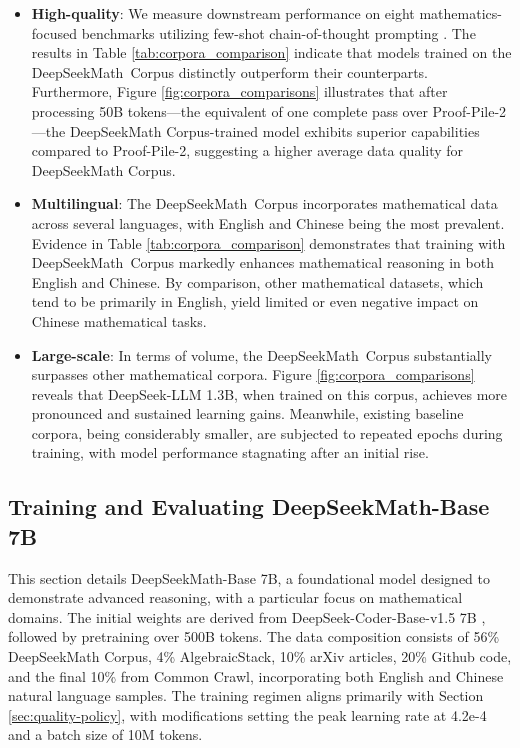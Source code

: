 \begin{itemize}[topsep=0pt]
    \item \textbf{High-quality}:
    We measure downstream performance on eight mathematics-focused benchmarks utilizing few-shot chain-of-thought prompting \cite{cot}. The results in Table \ref{tab:corpora_comparison} indicate that models trained on the DeepSeekMath~Corpus distinctly outperform their counterparts. Furthermore, Figure \ref{fig:corpora_comparisons} illustrates that after processing 50B tokens—the equivalent of one complete pass over Proof-Pile-2—the DeepSeekMath Corpus-trained model exhibits superior capabilities compared to Proof-Pile-2, suggesting a higher average data quality for DeepSeekMath Corpus.
    \item \textbf{Multilingual}:
    The DeepSeekMath~Corpus incorporates mathematical data across several languages, with English and Chinese being the most prevalent. Evidence in Table \ref{tab:corpora_comparison} demonstrates that training with DeepSeekMath~Corpus markedly enhances mathematical reasoning in both English and Chinese. By comparison, other mathematical datasets, which tend to be primarily in English, yield limited or even negative impact on Chinese mathematical tasks.
    \item \textbf{Large-scale}:
    In terms of volume, the DeepSeekMath~Corpus substantially surpasses other mathematical corpora. Figure \ref{fig:corpora_comparisons} reveals that DeepSeek-LLM 1.3B, when trained on this corpus, achieves more pronounced and sustained learning gains. Meanwhile, existing baseline corpora, being considerably smaller, are subjected to repeated epochs during training, with model performance stagnating after an initial rise.
\end{itemize}

\subsection{Training and Evaluating DeepSeekMath-Base 7B}

This section details DeepSeekMath-Base 7B, a foundational model designed to demonstrate advanced reasoning, with a particular focus on mathematical domains. The initial weights are derived from DeepSeek-Coder-Base-v1.5 7B \citep{deepseek-coder}, followed by pretraining over 500B tokens. The data composition consists of 56\% DeepSeekMath Corpus, 4\% AlgebraicStack, 10\% arXiv articles, 20\% Github code, and the final 10\% from Common Crawl, incorporating both English and Chinese natural language samples. The training regimen aligns primarily with Section \ref{sec:quality-policy}, with modifications setting the peak learning rate at 4.2e-4 and a batch size of 10M tokens.


